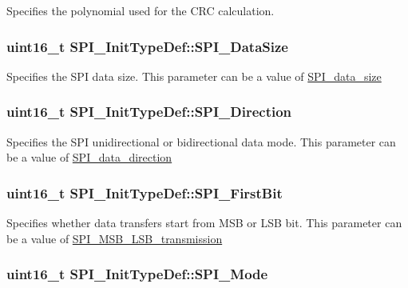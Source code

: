 \label{structSPI__InitTypeDef_aee6460416ade6c4016aac2bd64cae0eb}
Specifies the polynomial used for the CRC calculation. \hypertarget{structSPI__InitTypeDef_a0e63950d46a6483f9b7048b8c97800b8}{
\subsubsection[{SPI\_\-DataSize}]{\setlength{\rightskip}{0pt plus 5cm}uint16\_\-t {\bf SPI\_\-InitTypeDef::SPI\_\-DataSize}}}
\label{structSPI__InitTypeDef_a0e63950d46a6483f9b7048b8c97800b8}
Specifies the SPI data size. This parameter can be a value of \hyperlink{group__SPI__data__size}{SPI\_\-data\_\-size} \hypertarget{structSPI__InitTypeDef_a8cf0fefa76b9238a41997db14eac62a9}{
\subsubsection[{SPI\_\-Direction}]{\setlength{\rightskip}{0pt plus 5cm}uint16\_\-t {\bf SPI\_\-InitTypeDef::SPI\_\-Direction}}}
\label{structSPI__InitTypeDef_a8cf0fefa76b9238a41997db14eac62a9}
Specifies the SPI unidirectional or bidirectional data mode. This parameter can be a value of \hyperlink{group__SPI__data__direction}{SPI\_\-data\_\-direction} \hypertarget{structSPI__InitTypeDef_ace7ca292c290953f8a6ae86f79949f5b}{
\subsubsection[{SPI\_\-FirstBit}]{\setlength{\rightskip}{0pt plus 5cm}uint16\_\-t {\bf SPI\_\-InitTypeDef::SPI\_\-FirstBit}}}
\label{structSPI__InitTypeDef_ace7ca292c290953f8a6ae86f79949f5b}
Specifies whether data transfers start from MSB or LSB bit. This parameter can be a value of \hyperlink{group__SPI__MSB__LSB__transmission}{SPI\_\-MSB\_\-LSB\_\-transmission} \hypertarget{structSPI__InitTypeDef_a578435d3b3a17baa5d5ff87447aa697f}{
\subsubsection[{SPI\_\-Mode}]{\setlength{\rightskip}{0pt plus 5cm}uint16\_\-t {\bf SPI\_\-InitTypeDef::SPI\_\-Mode}}}
